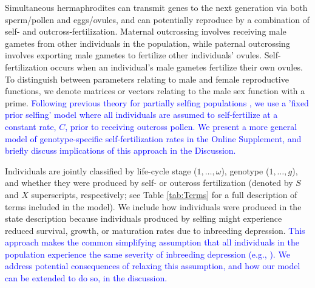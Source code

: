 \documentclass[11pt]{article}
\begin{document}
Simultaneous hermaphrodites can transmit genes to the next generation via both sperm/pollen and eggs/ovules, and can potentially reproduce by a combination of self- and outcross-fertilization. Maternal outcrossing involves receiving male gametes from other individuals in the population, while paternal outcrossing involves exporting male gametes to fertilize other individuals' ovules. Self-fertilization occurs when an individual's male gametes fertilize their own ovules. To distinguish between parameters relating to male and female reproductive functions, we denote matrices or vectors relating to the male sex function with a prime. \textcolor{blue}{Following previous theory for partially selfing populations \cite[e.g.,][]{Charlesworth2010,JordanConnallon2014,Glemin2021}, we use a 'fixed prior selfing' model where all individuals are assumed to self-fertilize at a constant rate, $C$, prior to receiving outcross pollen. We present a more general model of genotype-specific self-fertilization rates in the Online Supplement, and briefly discuss implications of this approach in the Discussion.}

Individuals are jointly classified by life-cycle stage ($1, \ldots, \omega$), genotype ($1, \ldots, g$), and whether they were produced by self- or outcross fertilization (denoted by $S$ and $X$ superscripts, respectively; see Table \ref{tab:Terms} for a full description of terms included in the model). We include how individuals were produced in the state description because individuals produced by selfing might experience reduced survival, growth, or maturation rates due to inbreeding depression. \textcolor{blue}{This approach makes the common simplifying assumption that all individuals in the population experience the same severity of inbreeding depression (e.g., \citealt{Charlesworth1987, Charlesworth2009, Charlesworth2010, JordanConnallon2014}). We address potential consequences of relaxing this assumption, and how our model can be extended to do so, in the discussion. }

\end{document}

